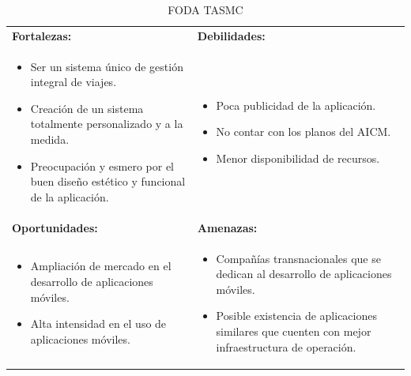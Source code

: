 \begin{table} 
	\begin{center}
		\begin{tabular}{|p{6.8cm}|p{6.8cm}|}
			\hline  
				\textbf{Fortalezas:} & \textbf{Debilidades:} \\
				{\parbox{0.45\textwidth}{
					\begin{itemize}
                			\item Ser un sistema único de gestión integral de viajes.
						\item Creación de un sistema totalmente personalizado y a la medida.
						\item Preocupación y esmero por el buen diseño estético y  funcional de la aplicación.
           			\end{itemize} }} &
				{\parbox{0.45\textwidth}{
					\begin{itemize}
                			\item Poca publicidad de la aplicación.
						\item No contar con los planos del AICM.
						\item Menor disponibilidad de recursos. 
           			\end{itemize} }}	\\
			\hline 
			\textbf{Oportunidades:} & \textbf{Amenazas:} \\
				{\parbox{0.45\textwidth}{
					\begin{itemize}
                			\item Ampliación de mercado en el desarrollo de aplicaciones móviles.
						\item Alta intensidad en el uso de aplicaciones móviles.
           			\end{itemize} }} &
				{\parbox{0.45\textwidth}{
					\begin{itemize}
                			\item Compañías transnacionales que se dedican al desarrollo de aplicaciones móviles. 
						\item Posible existencia de aplicaciones similares que cuenten con mejor infraestructura de operación. 
           			\end{itemize} }}	\\
			\hline 
		\end{tabular}
	\end{center}
	\caption[FODA TASMC]{FODA TASMC} 
	\label{tab:fodaTASMC}
\end{table}